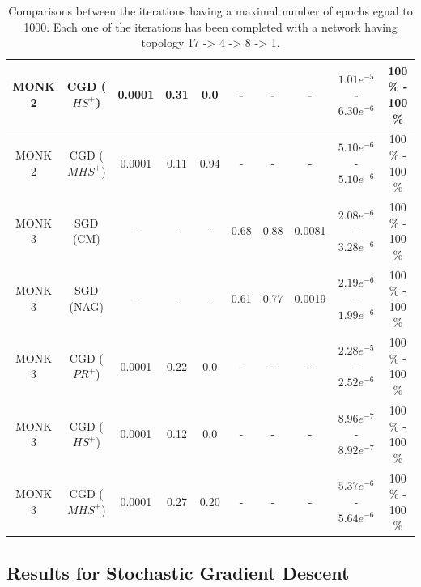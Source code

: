 \begin{table}[H]
\begin{subtable}{\textwidth}
{\begin{tabular}{| c | c | c | c | c | c | c | c | c | c |}
                            MONK 2 & CGD ($HS^{+}$) & 0.0001 & 0.31 & 0.0 & - & - & - &
                            $1.01e^{-5}$ - $6.30e^{-6}$ & 100 \% - 100 \% \\
                            \hline
                            \rowcolor[gray]{.9}
                            MONK 2 & CGD ($MHS^{+}$) & 0.0001 & 0.11 & 0.94 & - & - & - &
                            $5.10e^{-6}$ - $5.10e^{-6}$ & 100 \% - 100 \% \\
                            \hline
                            \hline
                            MONK 3 & SGD (CM) & - & - & - & 0.68 & 0.88 & 0.0081 &
                            $2.08e^{-6}$ - $3.28e^{-6}$
                            & 100 \% - 100 \% \\
                            \hline
                            MONK 3 & SGD (NAG) & - & - & - & 0.61 & 0.77 & 0.0019 &
                            $2.19e^{-6}$ - $1.99e^{-6}$ & 100 \% - 100 \% \\
                            \hline
                            MONK 3 & CGD ($PR^{+}$) & 0.0001 & 0.22 & 0.0 & - & - & - &
                            $2.28e^{-5}$ - $2.52e^{-6}$ & 100 \% - 100 \% \\
                            \hline
                            \rowcolor[gray]{.9}
                            MONK 3 & CGD ($HS^{+}$) & 0.0001 & 0.12 & 0.0 & - & - & - &
                            $8.96e^{-7}$ - $8.92e^{-7}$ & 100 \% - 100 \% \\
                            \hline
                            MONK 3 & CGD ($MHS^{+}$) & 0.0001 & 0.27 & 0.20 & - & - & - &
                            $5.37e^{-6}$ - $5.64e^{-6}$ & 100 \% - 100 \% \\
                            \hline
                        \end{tabular}
                    }
                \end{subtable}
                \caption{Comparisons between the iterations having a maximal number of epochs egual to 1000.
                Each one of the iterations has been completed with a network having topology
                17 -> 4 -> 8 -> 1.}
                \label{tab:monks_max_epochs}
            \end{table}


        \subsection{Results for Stochastic Gradient Descent} %
        \label{sub:results_for_stochastic_gradient_descent}


